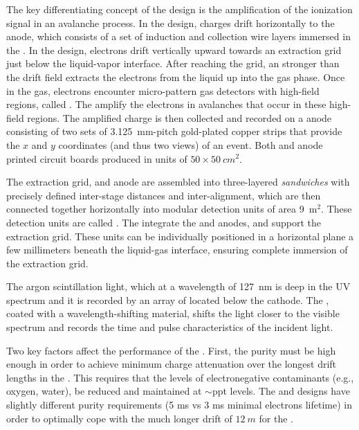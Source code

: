 The key differentiating concept of the \dual design is the amplification of the ionization signal in an avalanche process. In the \single design, charges drift horizontally to the anode, which consists of a set of induction and collection wire layers immersed in the \lar. In the \dual design, electrons drift vertically upward towards an extraction grid just below the liquid-vapor interface. After reaching the grid, an \efield stronger than the drift field extracts the electrons from the liquid up into the gas phase. Once in the gas, electrons encounter micro-pattern gas detectors with high-field regions, called . The  amplify the electrons in avalanches that occur in these high-field regions. The amplified charge is then collected and recorded on a \twod anode
consisting of two sets of \SI{3.125}{mm}-pitch gold-plated copper strips that provide the $x$ and $y$ coordinates (and thus two views) of an event. Both  and anode printed circuit boards produced in units of $50 \times 50 ~cm^2$.

The extraction grid,  and anode are assembled into three-layered \textit{sandwiches} with precisely defined inter-stage distances and inter-alignment,  which are then connected together horizontally into modular detection units of area \num{9}~m$^2$. These detection units are called . The  integrate the  and anodes, and support the extraction grid. These units can be individually positioned in a horizontal plane a few millimeters beneath the liquid-gas interface, ensuring complete immersion of the extraction grid. 

The argon scintillation light, which at a wavelength of  \SI{127}{nm} is deep in the UV spectrum and it is recorded by an array of  located below the cathode.  The , coated with a wavelength-shifting material, shifts the light  closer to the visible spectrum and records the time and pulse characteristics of the incident light.

Two key factors affect the performance of the  \lartpc{}.  First, the \lar purity must be high enough in order to achieve minimum charge attenuation over the longest drift lengths in the \lartpc{}.  This requires that the levels of electronegative contaminants (e.g., oxygen, water), be reduced and
maintained at $\sim$ppt levels.  The \dual and \single designs have slightly different purity requirements (5 ms vs 3 ms minimal electrons lifetime) in order to optimally cope with the much longer drift of $12~m$ for the \dual.


